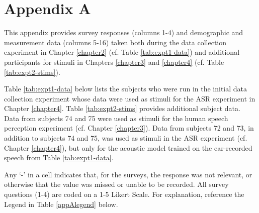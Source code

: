 % 
% 
% 


% 
\chapter*{Appendix A}\label{appendixA}

This appendix provides survey responses (columns 1-4) and demographic and measurement data (columns 5-16) taken both during the data collection experiment in Chapter \ref{chapter2} (cf. Table \ref{tab:expt1-data}) and additional participants for stimuli in Chapters \ref{chapter3} and \ref{chapter4} (cf. Table \ref{tab:expt2-stims}).

Table \ref{tab:expt1-data} below lists the subjects who were run in the initial data collection experiment whose data were used as stimuli for the ASR experiment in Chapter \ref{chapter4}.  Table \ref{tab:expt2-stims} provides additional subject data.  Data from subjects 74 and 75 were used as stimuli for the human speech perception experiment (cf. Chapter \ref{chapter3}).  Data from subjects 72 and 73, in addition to subjects 74 and 75, was used as stimuli in the ASR experiment (cf. Chapter \ref{chapter4}), but only for the acoustic model trained on the ear-recorded speech from Table \ref{tab:expt1-data}.   

Any `-' in a cell indicates that, for the surveys, the response was not relevant, or otherwise that the value was missed or unable to be recorded.  All survey questions (1-4) are coded on a 1-5 Likert Scale.  For explanation, reference the Legend in Table \ref{appAlegend} below.

